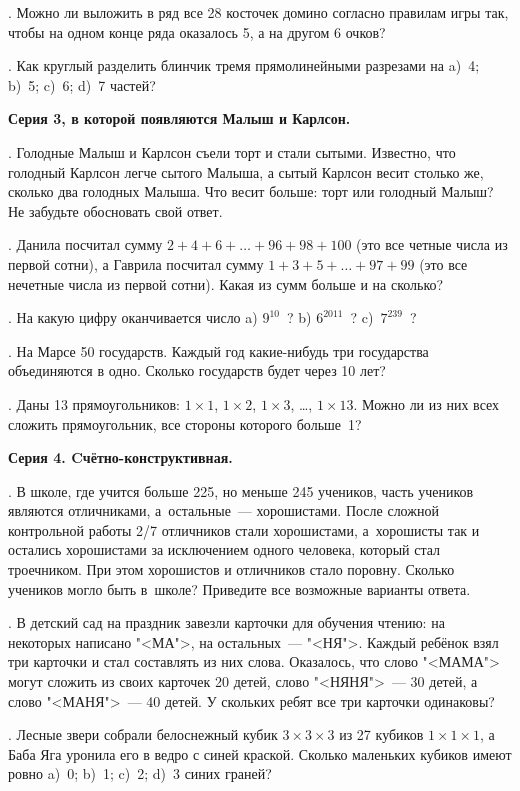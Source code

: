 .  Можно ли выложить в ряд все 28 косточек домино согласно
правилам игры так, чтобы на одном конце ряда оказалось 5, а на другом
6 очков?

. Как круглый разделить блинчик тремя прямолинейными разрезами на a)~4; 
b)~5; c)~6; d)~7 частей?


\centerline{\bf Серия 3, в которой появляются Малыш и Карлсон.}

. Голодные Малыш и Карлсон съели торт и стали сытыми. Известно,
что голодный Карлсон легче сытого Малыша, а сытый Карлсон весит
столько же, сколько два голодных Малыша. Что весит больше: торт или
голодный Малыш? Не забудьте обосновать свой ответ.

. Данила посчитал сумму $2+4+6+\ldots+96+98+100$
(это все четные числа из первой сотни),
а Гаврила посчитал сумму $1+3+5+\ldots+97+99$ 
(это все нечетные числа из первой сотни).
Какая из сумм больше и на сколько?

. На какую цифру оканчивается число a) $9^{10}$~?
b) $6^{2011}$~? c)~$7^{239}$~?


. На Марсе 50 государств. Каждый год какие-нибудь три государства
объединяются в одно. Сколько государств будет через 10 лет?

. Даны 13 прямоугольников: $1\times 1$, $1\times 2$, $1\times 3$, \ldots, $1\times 13$.
Можно ли из них всех сложить прямоугольник, все стороны которого больше~1?

\centerline{\bf Серия 4. Cчётно-конструктивная.}

.  В школе, где учится больше 225, но меньше 245 учеников, часть
учеников являются отличниками, а~остальные~--- хорошистами. После сложной
контрольной работы 2/7 отличников стали хорошистами,
а~хорошисты так и остались хорошистами за исключением одного человека,
который стал троечником. При этом хорошистов и отличников
стало поровну. Сколько учеников могло быть в~школе?
Приведите все возможные варианты ответа.

. В детский сад на праздник завезли карточки для обучения чтению: на
некоторых написано "<МА">, на остальных~--- "<НЯ">. Каждый ребёнок взял
три карточки и стал составлять из них слова. Оказалось, что слово
"<МАМА"> могут сложить из своих карточек 20 детей, слово "<НЯНЯ">~---
30 детей, а слово "<МАНЯ">~--- 40 детей. У скольких ребят все три
карточки одинаковы?

.  Лесные звери собрали белоснежный кубик $3\times 3\times 3$ из 27 кубиков $1\times 1\times 1$, 
а Баба Яга уронила его в ведро с синей краской.
Сколько маленьких кубиков имеют ровно a)~0; b)~1; c)~2; d)~3 синих граней?


